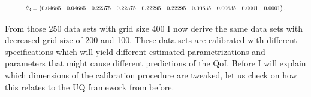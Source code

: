 \begin{equation*}
	\resizebox{.9\hsize}{!}{$\theta_3 = \begin{pmatrix}
		0.04685 & 0.04685 & 0.22375 & 0.22375 & 0.22295	& 0.22295 & 0.00635 & 0.00635 & 0.0001 & 0.0001
		\end{pmatrix}.$}
\end{equation*}

From those 250 data sets with grid size 400 I now derive the same data sets with decreased grid size of 200 and 100. These data sets are calibrated with different specifications which will yield different estimated parametrizations and parameters that might cause different predictions of the QoI. Before I will explain which dimensions of the calibration procedure are tweaked, let us check on how this relates to the UQ framework from before.

